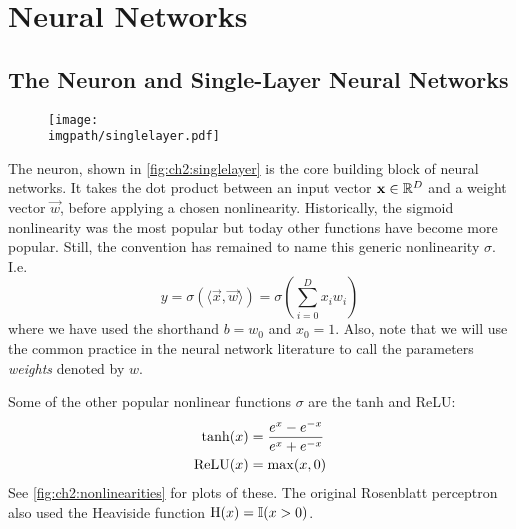 \section{Neural Networks}\label{sec:ch2:nns}
\subsection{The Neuron and Single-Layer Neural Networks}

\begin{figure}
  \centering
  \texttt{[image: \\imgpath/singlelayer.pdf]}
  \label{fig:ch2:singlelayer}
\end{figure}

The neuron, shown in \autoref{fig:ch2:singlelayer} is the core building block of
neural networks. It takes the dot product between an input vector $\vec{x} \in
\reals[D]$ and a weight vector $\vec{w}$, before applying a chosen nonlinearity.
Historically, the sigmoid nonlinearity was the most popular but today other
functions have become more popular. Still, the convention has remained to name this
generic nonlinearity $\sigma$. I.e.
%
\begin{equation}
  y = \sigma(\langle\vec{x}, \vec{w}\rangle) = \sigma\left(\sum_{i=0}^{D} x_i w_i \right)
\end{equation}
%
where we have used the shorthand $b=w_0$ and $x_0 = 1$. Also, note that we will
use the common practice in the neural network literature to call the parameters
\emph{weights} denoted by $w$.

Some of the other popular nonlinear functions $\sigma$ are
the tanh and ReLU:
\begin{align}
  \F{tanh}(x) &= \frac{e^{x} - e^{-x}}{e^{x} + e^{-x}} \label{eq:ch2:tanh}\\
  \F{ReLU}(x) &= \max (x, 0) \label{eq:ch2:relu}
\end{align}
%
See \autoref{fig:ch2:nonlinearities} for plots of these. The original Rosenblatt
perceptron \cite{rosenblatt_perceptron:_1958} also used the Heaviside function
$\F{H}(x) = \mathbb{I}(x > 0)$. %

